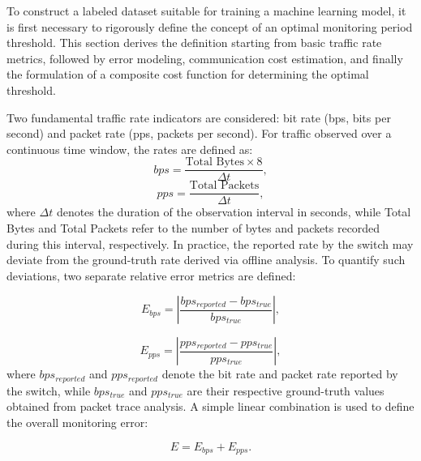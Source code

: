 \noindent To construct a labeled dataset suitable for training a machine learning model, it is first necessary to rigorously define the concept of an optimal monitoring period threshold. 
This section derives the definition starting from basic traffic rate metrics, followed by error modeling, communication cost estimation, and finally the formulation of a composite cost function for determining the optimal threshold.

Two fundamental traffic rate indicators are considered: bit rate (bps, bits per second) and packet rate (pps, packets per second). 
For traffic observed over a continuous time window, the rates are defined as:
\begin{equation}
    bps = \frac{\text{Total Bytes} \times 8}{\Delta t} ,
\end{equation}
\begin{equation}
    pps = \frac{\text{Total Packets}}{\Delta t} ,
\end{equation}
where $\Delta t$ denotes the duration of the observation interval in seconds, while Total Bytes and Total Packets refer to the number of bytes and packets recorded during this interval, respectively. 
In practice, the reported rate by the switch may deviate from the ground-truth rate derived via offline analysis. 
To quantify such deviations, two separate relative error metrics are defined:

\begin{equation}
    \label{eq:err_bps}
    E_{bps} = \left| \frac{bps_{reported} - bps_{true}}{bps_{true}} \right| ,
\end{equation}

\begin{equation}
    \label{eq:err_pps}
    E_{pps} = \left| \frac{pps_{reported} - pps_{true}}{pps_{true}} \right| ,
\end{equation}
where $bps_{reported}$ and $pps_{reported}$ denote the bit rate and packet rate reported by the switch, while $bps_{true}$ and $pps_{true}$ are their respective ground-truth values obtained from packet trace analysis. 
A simple linear combination is used to define the overall monitoring error:

\begin{equation}
    \label{eq:E}
    E = E_{bps} + E_{pps} .
\end{equation}

